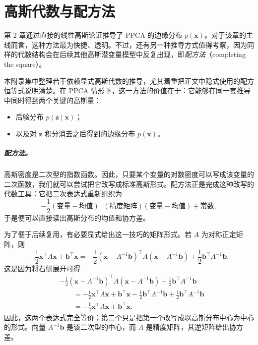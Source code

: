 \chapter{高斯代数与配方法}
\label{app:completing-square}

第 2 章通过直接的线性高斯论证推导了 PPCA 的边缘分布 \(p(\mathbf{x})\)。对于该章的主线而言，这种方法最为快捷、透明。不过，还有另一种推导方式值得考察，因为同样的代数结构会在后续其他高斯潜变量模型中反复出现，即\emph{配方法}（completing the square）。

本附录集中整理若干依赖显式高斯代数的推导，尤其着重把正文中隐式使用的配方恒等式说明清楚。在 PPCA 情形下，这一方法的价值在于：它能够在同一套推导中同时得到两个关键的高斯量：
\begin{itemize}
    \item 后验分布 \(p(\mathbf{z}\mid \mathbf{x})\)；
    \item 以及对 \(\mathbf{z}\) 积分消去之后得到的边缘分布 \(p(\mathbf{x})\)。
\end{itemize}

\paragraph{配方法。}
高斯密度是二次型的指数函数。因此，只要某个变量的对数密度可以写成该变量的二次函数，我们就可以尝试把它改写成标准高斯形式。配方法正是完成这种改写的代数工具：它把二次表达式重新组织为
\[
-\frac12 (\text{变量} - \text{均值})^\top
(\text{精度矩阵})
(\text{变量} - \text{均值})
+\text{常数},
\]
于是便可以直接读出高斯分布的均值和协方差。

为了便于后续复用，有必要显式给出这一技巧的矩阵形式。若 \(A\) 为对称正定矩阵，则
\[
-\frac12 \mathbf{x}^\top A \mathbf{x} + \mathbf{b}^\top \mathbf{x}
=
-\frac12 (\mathbf{x}-A^{-1}\mathbf{b})^\top A (\mathbf{x}-A^{-1}\mathbf{b})
+\frac12 \mathbf{b}^\top A^{-1}\mathbf{b}.
\]
这是因为将右侧展开可得
\[
\begin{aligned}
&-\frac12 (\mathbf{x}-A^{-1}\mathbf{b})^\top A (\mathbf{x}-A^{-1}\mathbf{b})
+\frac12 \mathbf{b}^\top A^{-1}\mathbf{b} \\[4pt]
&\qquad=
-\frac12 \mathbf{x}^\top A \mathbf{x}
+\mathbf{b}^\top \mathbf{x}
-\frac12 \mathbf{b}^\top A^{-1}\mathbf{b}
+\frac12 \mathbf{b}^\top A^{-1}\mathbf{b} \\[4pt]
&\qquad=
-\frac12 \mathbf{x}^\top A \mathbf{x}+\mathbf{b}^\top \mathbf{x}.
\end{aligned}
\]
因此，这两个表达式完全等价；第二个只是把第一个改写成以高斯分布中心为中心的形式。向量 \(A^{-1}\mathbf{b}\) 是该二次型的中心，而 \(A\) 是精度矩阵，其逆矩阵给出协方差。

